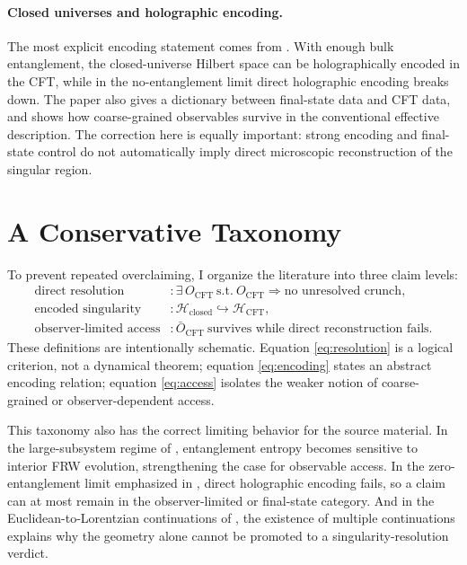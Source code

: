 \documentclass[11pt]{article}
\begin{document}
\paragraph{Closed universes and holographic encoding.}
The most explicit encoding statement comes from \cite{Rath:2025baby}. With enough bulk entanglement, the closed-universe Hilbert space can be holographically encoded in the CFT, while in the no-entanglement limit direct holographic encoding breaks down. The paper also gives a dictionary between final-state data and CFT data, and shows how coarse-grained observables survive in the conventional effective description. The correction here is equally important: strong encoding and final-state control do not automatically imply direct microscopic reconstruction of the singular region.

\section{A Conservative Taxonomy}

To prevent repeated overclaiming, I organize the literature into three claim levels:
\begin{align}
\text{direct resolution} &: \exists\, O_{\mathrm{CFT}} \ \text{s.t.}\ O_{\mathrm{CFT}} \Rightarrow \text{no unresolved crunch}, \label{eq:resolution}\\
\text{encoded singularity} &: \mathcal{H}_{\mathrm{closed}} \hookrightarrow \mathcal{H}_{\mathrm{CFT}}, \label{eq:encoding}\\
\text{observer-limited access} &: \bar O_{\mathrm{CFT}} \ \text{survives while direct reconstruction fails}. \label{eq:access}
\end{align}
These definitions are intentionally schematic. Equation \eqref{eq:resolution} is a logical criterion, not a dynamical theorem; equation \eqref{eq:encoding} states an abstract encoding relation; equation \eqref{eq:access} isolates the weaker notion of coarse-grained or observer-dependent access.

This taxonomy also has the correct limiting behavior for the source material. In the large-subsystem regime of \cite{Cooper:2018cmb}, entanglement entropy becomes sensitive to interior FRW evolution, strengthening the case for observable access. In the zero-entanglement limit emphasized in \cite{Rath:2025baby}, direct holographic encoding fails, so a claim can at most remain in the observer-limited or final-state category. And in the Euclidean-to-Lorentzian continuations of \cite{VanRaamsdonk:2021qgv,Antonini:2024magnetic}, the existence of multiple continuations explains why the geometry alone cannot be promoted to a singularity-resolution verdict.
\end{document}
